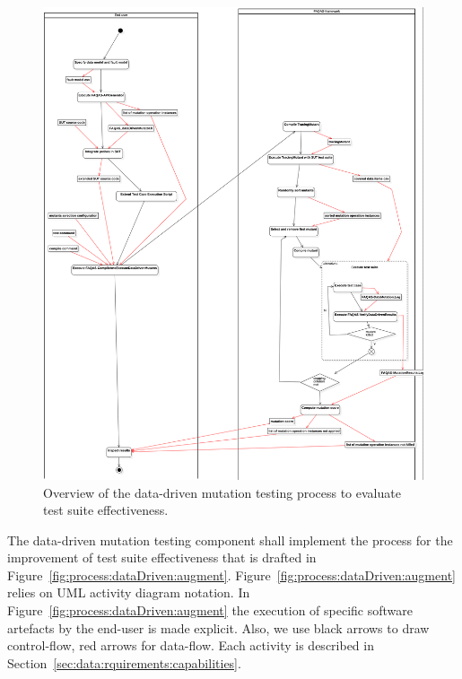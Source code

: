 \begin{figure}[h]
  \centering
	\includegraphics[width=15cm]{images/png/Activity1!DataDrivenTestSuiteEvaluation_3.png}
      \caption{Overview of the data-driven mutation testing process to evaluate test suite effectiveness.}
      \label{fig:process:dataDriven:evaluation}
\end{figure}

\RQ{} The data-driven mutation testing component shall implement the process for the improvement of test suite effectiveness that is drafted in Figure~\ref{fig:process:dataDriven:augment}. Figure~\ref{fig:process:dataDriven:augment} relies on UML activity diagram notation. In Figure~\ref{fig:process:dataDriven:augment} the execution of specific software artefacts by the end-user is made explicit. Also, we use black arrows to draw control-flow, red arrows for data-flow. Each activity is described in Section~\ref{sec:data:rquirements:capabilities}.

